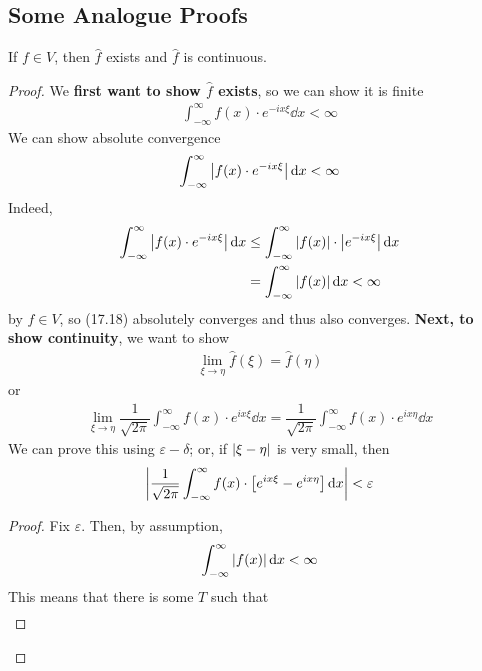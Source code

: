 \subsection{Some Analogue Proofs}
\begin{lemma}
    If $f \in V$, then $\hat{f}$ exists and $\hat{f}$ is continuous.
\end{lemma}
\begin{proof}
    We \textbf{first want to show $\hat{f}$ exists}, so we can show it is finite
    \begin{align}
        \int_{-\infty}^\infty f(x) \cdot e^{-ix\xi} \dd{x} < \infty
    \end{align}
    We can show absolute convergence
    \begin{align}
        \int_{-\infty}^\infty \abs{f(x) \cdot e^{-ix\xi}} \dd{x} < \infty
    \end{align}
    Indeed,
    \begin{align}
        \int_{-\infty}^\infty \abs{f(x) \cdot e^{-ix\xi}} \dd{x} &\le \int_{-\infty}^\infty \abs{f(x)} \cdot \abs{e^{-ix\xi}} \dd{x}\\
        &= \int_{-\infty}^\infty \abs{f(x)} \dd{x} < \infty
    \end{align}
    by $f \in V$, so (17.18) absolutely converges and thus also converges. \textbf{Next, to show continuity}, we want to show
    \begin{align}
        \lim_{\xi \to \eta} \hat{f}(\xi) = \hat{f}(\eta)
    \end{align}
    or
    \begin{align}
        \lim_{\xi \to \eta} \dfrac{1}{\sqrt{2\pi}} \int_{-\infty}^\infty f(x) \cdot e^{ix\xi} \dd{x} = \dfrac{1}{\sqrt{2\pi}} \int_{-\infty}^\infty f(x) \cdot e^{ix\eta} \dd{x}
    \end{align}
    We can prove this using $\varepsilon-\delta$; or, if $\abs{\xi - \eta}$ is very small, then
    \begin{align}
        \abs{\dfrac{1}{\sqrt{2\pi}} \int_{-\infty}^\infty f(x) \cdot \left[e^{ix\xi} - e^{ix\eta}\right] \dd{x}} < \varepsilon
    \end{align}
    \begin{proof}
        Fix $\varepsilon$. Then, by assumption,
        \begin{align}
            \int_{-\infty}^\infty \abs{f(x)} \dd{x} < \infty
        \end{align}
        This means that there is some $T$ such that
        \begin{align}

\end{align}
\end{proof}
\end{proof}
